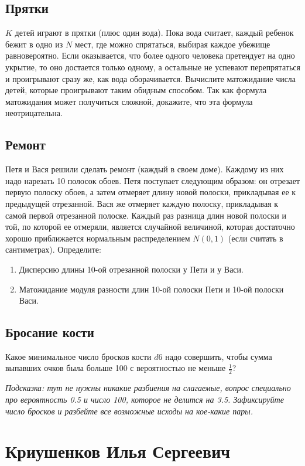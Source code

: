 \documentclass[12pt]{article}
\begin{document}
\subsection{Прятки}
$K$ детей играют в прятки (плюс один вода). Пока вода считает, каждый ребенок бежит в одно из $N$ мест, где можно спрятаться, выбирая каждое убежище равновероятно. Если оказывается, что более одного человека претендует на одно укрытие, то оно достается только одному, а остальные не успевают перепрятаться и проигрывают сразу же, как вода оборачивается. Вычислите матожидание числа детей, которые проигрывают таким обидным способом. Так как формула матожидания может получиться сложной, докажите, что эта формула неотрицательна.

\subsection{Ремонт}
Петя и Вася решили сделать ремонт (каждый в своем доме). Каждому из них надо нарезать 10 полосок обоев. Петя поступает следующим образом: он отрезает первую полоску обоев, а затем отмеряет длину новой полоски, прикладывая ее к предыдущей отрезанной. Вася же отмеряет каждую полоску, прикладывая к самой первой отрезанной полоске. Каждый раз разница длин новой полоски и той, по которой ее отмеряли, является случайной величиной, которая достаточно хорошо приближается нормальным распределением $N(0, 1)$ (если считать в сантиметрах). Определите:
\begin{enumerate}
    \item Дисперсию длины 10-ой отрезанной полоски у Пети и у Васи.
    \item Матожидание модуля разности длин 10-ой полоски Пети и 10-ой полоски Васи. 
\end{enumerate}

\subsection{Бросание кости}
Какое минимальное число бросков кости $d6$ надо совершить, чтобы сумма выпавших очков была больше 100 с вероятностью не меньше $\frac{1}{2}$? 

\emph{Подсказка: тут не нужны никакие разбиения на слагаемые, вопрос специально про вероятность 0.5 и число 100, которое не делится на 3.5. Зафиксируйте число бросков и разбейте все возможные исходы на кое-какие пары.}

\newpage
\section{Криушенков Илья Сергеевич}
\end{document}
